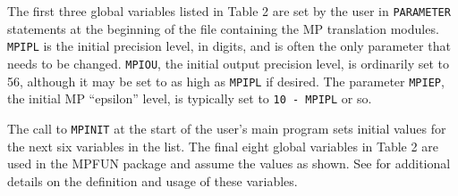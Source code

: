 The first three global variables listed in Table 2 are set by the user
in {\tt PARAMETER} statements at the beginning of the file containing
the MP translation modules.  {\tt MPIPL} is the initial precision
level, in digits, and is often the only parameter that needs to be
changed.  {\tt MPIOU}, the initial output precision level, is
ordinarily set to 56, although it may be set to as high as {\tt MPIPL}
if desired.  The parameter {\tt MPIEP}, the initial MP ``epsilon''
level, is typically set to {\tt 10 - MPIPL} or so.

The call to {\tt MPINIT} at the start of the user's main program sets
initial values for the next six variables in the list.  The final
eight global variables in Table 2 are used in the MPFUN package and
assume the values as shown.  See \cite{dhb-mpfun} for additional
details on the definition and usage of these variables.

